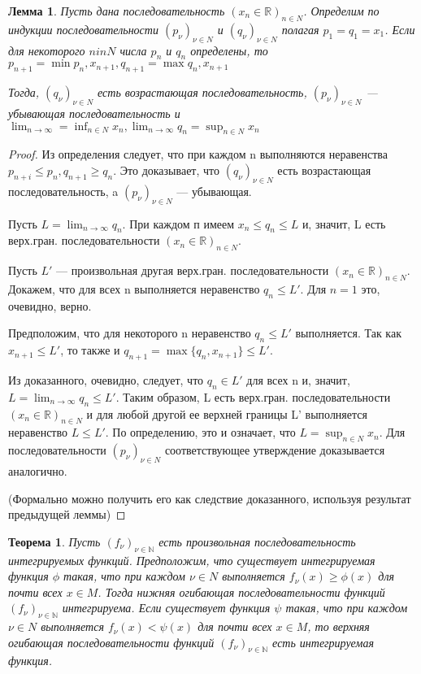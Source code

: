 \documentclass[a4paper]{article}
\newtheorem{theorem}{Теорема}[section]
\newtheorem{lemma}{Лемма}[section]
\theoremstyle{definition}
\theoremstyle{remark}
\begin{document}
     \begin{lemma}
          Пусть дана последовательность $(x_n \in \mathbb{R})_{n\in N}$.  
          Определим по индукции последовательности $(p_\nu)_{\nu \in N}$ и 
          $(q_\nu)_{\nu \in N}$ полагая 
          $p_1 = q_1 = x_1$. Если для некоторого $n in N$ числа $p_n$ и $q_n$ определены, 
          то $p_{n+1} = \min{p_n,x_{n+1}}, q_{n+1} = \max{q_n, x_{n+1}}$
          
          Тогда, $(q_\nu)_{\nu \in N}$ есть 
          возрастающая последовательность, $(p_\nu)_{\nu \in N}$ — убывающая  
          последовательность и 
          $\lim_{n\to \infty} = \inf_{n\in N}x_n, \lim_{n\to \infty}q_n = \sup_{n\in N} x_n$
     \end{lemma}
     \begin{proof}
          Из определения следует, что при каждом n  
          выполняются неравенства $p_{n+i} \leq p_n, q_{n+1} \geq q_n$. Это доказывает, что 
          $(q_\nu)_{\nu \in N}$ есть возрастающая последовательность, a $(p_\nu)_{\nu \in N}$ —  
          убывающая. 
          
          Пусть $L = \lim_{n\to \infty}q_n$. При каждом п имеем $x_n \leq q_n \leq L$ и, значит, L
          есть верх.гран. последовательности $(x_n \in \mathbb{R})_{n\in N}$.

          Пусть $L'$ — произвольная другая верх.гран.  
          последовательности $(x_n \in \mathbb{R})_{n\in N}$. 
          Докажем, что для всех n выполняется неравенство $q_n \leq L'$. Для 
          $n = 1$ это, очевидно, верно. 

          Предположим, что для некоторого n неравенство $q_n \leq L'$  
          выполняется. Так как $x_{n+1} \leq L'$, то также и $q_{n+1} = \max\{q_n, x_{n+1}\}\leq L'$. 
          
          Из доказанного, очевидно, следует, что $q_n \in L'$ для всех n и,  
          значит, $L = \lim_{n\to \infty}q_n\leq L'$. Таким образом, L есть верх.гран. 
          последовательности $(x_n \in \mathbb{R})_{n\in N}$ и для любой другой ее верхней границы L' 
          выполняется неравенство $L \leq L'$. По определению, это и означает, что 
          $L = \sup_{n\in N}x_n$. Для последовательности $(p_\nu)_{\nu \in N}$ соответствующее 
          утверждение доказывается аналогично. 

          (Формально можно получить его как 
          следствие доказанного, используя результат предыдущей леммы)
     \end{proof}
     \begin{theorem}
          Пусть $(f_\nu)_{\nu\in \mathbb{N}}$ есть произвольная  
          последовательность интегрируемых функций. Предположим, что существует  
          интегрируемая функция $\phi$ такая, что при каждом $\nu \in N$ выполняется 
          $f_\nu(x)\geq \phi(x)$ для почти всех $x \in M$. Тогда нижняя огибающая  
          последовательности функций $(f_\nu)_{\nu\in \mathbb{N}}$ интегрируема. Если существует  
          функция $\psi$ такая, что при каждом $\nu \in N$ выполняется $f_\nu(x) < \psi(x)$ для 
          почти всех $x \in M$, то верхняя огибающая последовательности функций 
          $(f_\nu)_{\nu\in \mathbb{N}}$ есть интегрируемая функция. 
     \end{theorem}
\end{document}
